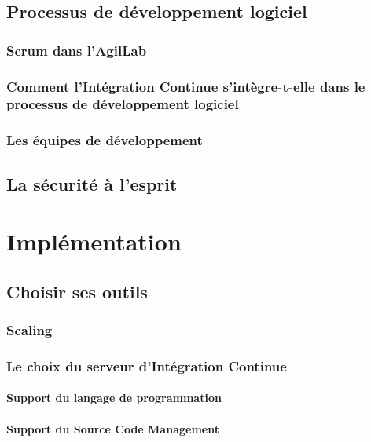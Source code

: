 \documentclass{report}
\begin{document}
      \section{Processus de développement logiciel}

        \subsection{Scrum dans l'AgilLab}

        \subsection{Comment l’Intégration Continue s’intègre-t-elle dans le processus de développement logiciel}

        \subsection{Les équipes de développement}

      \section{La sécurité à l'esprit}

    \chapter{Implémentation}

      \section{Choisir ses outils}

        \subsection{Scaling}

        \subsection{Le choix du serveur d’Intégration Continue}
          \subsubsection{Support du langage de programmation}

          \subsubsection{Support du Source Code Management}
\end{document}
